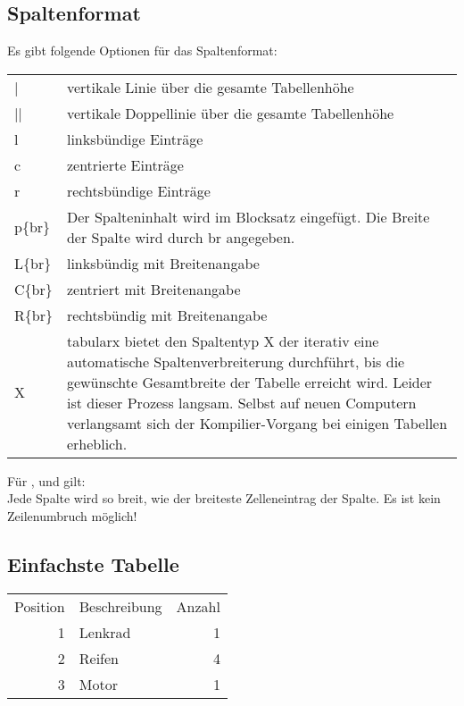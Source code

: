 \subsection{Spaltenformat}%
%
Es gibt folgende Optionen für das Spaltenformat:%
%
\begin{table}[H]
\begin{center}
\begin{tabularx}{\textwidth}{lX}
|    &    vertikale Linie über die gesamte Tabellenhöhe\\
||   &    vertikale Doppellinie über die gesamte Tabellenhöhe\\
l    &    linksbündige Einträge\\
c    &    zentrierte Einträge\\
r    &    rechtsbündige Einträge\\
p\{br\}    &    Der Spalteninhalt wird im Blocksatz eingefügt. Die Breite der Spalte wird durch br angegeben.\\
L\{br\}    &    linksbündig mit Breitenangabe\\
C\{br\}    &    zentriert mit Breitenangabe\\
R\{br\}    &    rechtsbündig mit Breitenangabe\\
X    & tabularx bietet den Spaltentyp X der iterativ eine automatische Spaltenverbreiterung durchführt, bis die gewünschte Gesamtbreite der Tabelle erreicht wird. Leider ist dieser Prozess langsam. Selbst auf neuen Computern verlangsamt sich der Kompilier-Vorgang bei einigen Tabellen erheblich.
\end{tabularx}
\end{center}
\end{table}
%
%
%
%
Für ,  und  gilt:\\%
Jede Spalte wird so breit, wie der breiteste Zelleneintrag der Spalte. Es ist kein Zeilenumbruch möglich!%
%
%
%
%
\newpage%
\subsection{Einfachste Tabelle}%
%
\begin{table}[h]
\begin{center}
\begin{tabular}{rlr}
   Position & Beschreibung & Anzahl \\
          1 & Lenkrad      &      1 \\
          2 & Reifen       &      4 \\
          3 & Motor        &      1 \\
\end{tabular}
\end{center}
\label{tab:1}
\end{table}
%
%
%
